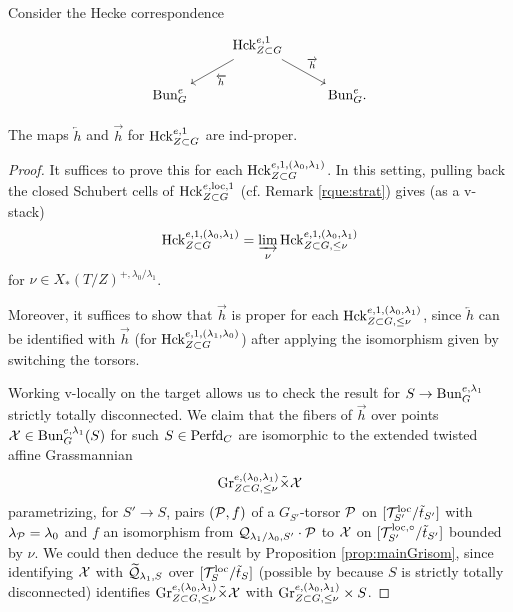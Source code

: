 Consider the Hecke correspondence
\[
\begin{tikzcd}
  &  \Hck_{Z \subset G}^{e,1} \arrow["\overleftarrow{h}"]{ld} \arrow["\overrightarrow{h}"]{rd} & \\
  \Bun_{G}^{e} & & \Bun_{G}^{e}.
\end{tikzcd}
\]

\begin{prop}\label{prop:Heckeproper} The maps $\overleftarrow{h}$ and $\overrightarrow{h}$ for $\mathrm{Hck}^{e,1}_{Z \subset G}$ are ind-proper.
\end{prop}
\begin{proof} It suffices to prove this for each $\mathrm{Hck}^{e,1,(\lambda_{0},\lambda_{1})}_{Z \subset G}$. In this setting, pulling back the closed Schubert cells of $\mathrm{Hck}_{Z \subset G}^{e,\mathrm{loc},1}$ (cf. Remark \ref{rque:strat}) gives (as a v-stack)
\begin{equation*}
\mathrm{Hck}^{e,1,(\lambda_{0},\lambda_{1})}_{Z \subset G} = \varinjlim_{\nu} \mathrm{Hck}^{e,1,(\lambda_{0},\lambda_{1})}_{Z \subset G,\leq \nu} 
\end{equation*}
for $\nu \in X_{*}(T/Z)^{+,\lambda_{0}/\lambda_{1}}$. 

Moreover, it suffices to show that $\overrightarrow{h}$ is proper for each $\mathrm{Hck}^{e,1,(\lambda_{0},\lambda_{1})}_{Z \subset G,\leq \nu}$, since $\overleftarrow{h}$ can be identified with $\overrightarrow{h}$ (for $\mathrm{Hck}_{Z \subset G}^{e,1,(\lambda_{1},\lambda_{0})}$) after applying the isomorphism given by switching the torsors.

Working v-locally on the target allows us to check the result for $S \to \mathrm{Bun}_{G}^{e,\lambda_{1}}$ strictly totally disconnected. We claim that the fibers of $\overrightarrow{h}$ over points $\mathcal{X} \in \mathrm{Bun}_{G}^{e,\lambda_{1}}(S)$ for such $S \in \mathrm{Perfd}_{C}$ are isomorphic to the extended twisted affine Grassmannian
\begin{equation*}
\textnormal{Gr}_{Z \subset G,\leq \nu}^{e,(\lambda_{0},\lambda_{1})} \tilde{\times} \mathcal{X}
\end{equation*}
parametrizing, for $S' \to S$, pairs $(\mathcal{P},f)$ of a $G_{S'}$-torsor $\mathcal{P}$ on $[\mathcal{T}_{S'}^{\mathrm{loc}}/\tilde{t}_{S'}]$ with $\lambda_{\mathcal{P}} = \lambda_{0}$ and $f$ an isomorphism from $\mathcal{Q}_{\lambda_{1}/\lambda_{0},S'} \cdot \mathcal{P}$ to $\mathcal{X}$ on $[\mathcal{T}_{S'}^{\mathrm{loc},\circ}/\tilde{t}_{S'}]$ bounded by $\nu$.
We could then deduce the result by Proposition \ref{prop:mainGrisom}, since identifying $\mathcal{X}$ with $\widetilde{\mathcal{Q}}_{\lambda_{1},S}$ over $[\mathcal{T}_{S}^{\mathrm{loc}}/\tilde{t}_{S}]$ (possible by \cite[Lemma III.2.6]{Geometrization} because $S$ is strictly totally disconnected) identifies $\textnormal{Gr}_{Z \subset G,\leq \nu}^{e,(\lambda_{0},\lambda_{1})} \tilde{\times} \mathcal{X}$ with $\textnormal{Gr}_{Z \subset G,\leq \nu}^{e,(\lambda_{0},\lambda_{1})}\times S$. 


\end{proof}
